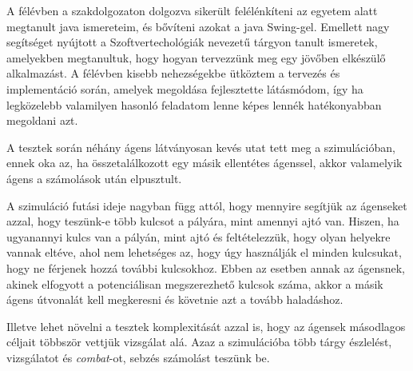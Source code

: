 
A félévben a szakdolgozaton dolgozva sikerült felélénkíteni az egyetem alatt megtanult java ismereteim,
és bővíteni azokat a java Swing-gel. Emellett nagy segítséget nyújtott a Szoftvertechológiák nevezetű tárgyon
tanult ismeretek, amelyekben megtanultuk, hogy hogyan tervezzünk meg egy jövőben elkészülő alkalmazást.
A félévben kisebb nehezségekbe ütköztem a tervezés és implementáció során, amelyek megoldása fejlesztette látásmódom,
így ha legközelebb valamilyen hasonló feladatom lenne képes lennék hatékonyabban megoldani azt.

A tesztek során néhány ágens látványosan kevés utat tett meg a szimulációban, ennek oka az, ha összetalálkozott egy másik
ellentétes ágenssel, akkor valamelyik ágens a számolások után elpusztult.

A szimuláció futási ideje nagyban függ attól, hogy mennyire segítjük az ágenseket azzal, hogy teszünk-e több kulcsot a pályára, mint
amennyi ajtó van. Hiszen, ha ugyanannyi kulcs van a pályán, mint ajtó és feltételezzük, hogy olyan helyekre vannak eltéve, ahol
nem lehetséges az, hogy úgy használják el minden kulcsukat, hogy ne férjenek hozzá további kulcsokhoz. Ebben az esetben annak az ágensnek, akinek elfogyott
a potenciálisan megszerezhető kulcsok száma, akkor a másik ágens útvonalát kell megkeresni és követnie azt a tovább haladáshoz.

Illetve lehet növelni a tesztek komplexitását azzal is, hogy az ágensek másodlagos céljait többször vettjük vizsgálat alá. Azaz a szimulációba több tárgy észlelést, vizsgálatot és \textit{combat}-ot, sebzés számolást teszünk be.